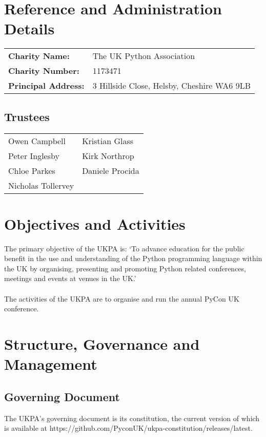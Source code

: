\documentclass[11pt, final]{article}
\begin{document}

    \section{Reference and Administration Details}
    \begin{tabular}{l l}
        \textbf{Charity Name:} & The UK Python Association \\
        \textbf{Charity Number:} & 1173471 \\
        \textbf{Principal Address:} & 3 Hillside Close, Helsby, Cheshire WA6 9LB\\
    \end{tabular}

        \subsection{Trustees}
        \begin{tabular}{l l}
            Owen Campbell & Kristian Glass\\
            Peter Inglesby & Kirk Northrop\\
            Chloe Parkes & Daniele Procida\\
            Nicholas Tollervey & \\
        \end{tabular}
        
    \section{Objectives and Activities}
    The primary objective of the UKPA is: `To advance education for the public benefit in the use and understanding of the Python programming language within the UK by organising, presenting and promoting Python related conferences, meetings and events at venues in the UK.'\\
    \\
    The activities of the UKPA are to organise and run the annual PyCon UK conference.

    \section{Structure, Governance and Management}

        \subsection{Governing Document}
        The UKPA's governing document is its constitution, the current version of which is available at https://github.com/PyconUK/ukpa-constitution/releases/latest. 
\end{document}
